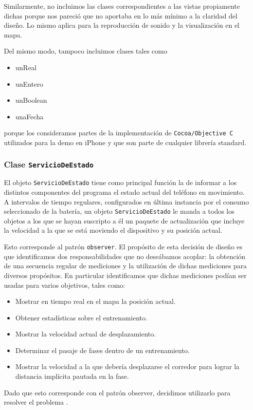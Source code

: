 \documentclass[10pt, a4paper,english,spanish]{article}
\begin{document}
Similarmente, no incluimos las clases correspondientes a las vistas propiamente dichas porque nos pareció que no aportaba en lo más mínimo a la claridad del diseño. Lo mismo aplica para la reproducción de sonido y la visualización en el mapa. 

Del mismo modo, tampoco incluimos clases tales como 
\begin{itemize}
	\item unReal
	\item unEntero
	\item unBoolean
	\item unaFecha
\end{itemize}
porque los consideramos partes de la implementación de \texttt{Cocoa/Objective C} utilizados para la demo en iPhone y que son parte de cualquier librería standard.


\subsubsection{Clase \texttt{ServicioDeEstado}}
El objeto \texttt{ServicioDeEstado} tiene como principal función la de informar a los distintos componentes del programa el estado actual del teléfono en movimiento. A intervalos de tiempo regulares, configurados en última instancia por el consumo seleccionado de la batería, un objeto \texttt{ServicioDeEstado} le manda a todos los objetos a los que se hayan suscripto a él un paquete de actualización que incluye la velocidad a la que se está moviendo el dispositivo y su posición actual.

Esto corresponde al patrón \texttt{observer}. El propósito de esta decisión de diseño es que identificamos dos responsabilidades que no deseábamos acoplar: la obtención de una secuencia regular de mediciones y la utilización de dichas mediciones para diversos propósitos. En particular identificamos que dichas mediciones podían ser usadas para varios objetivos, tales como:
\begin{itemize}
	\item Mostrar en tiempo real en el mapa la posición actual.
	\item Obtener estadísticas sobre el entrenamiento.
	\item Mostrar la velocidad actual de desplazamiento.
	\item Determinar el pasaje de fases dentro de un entrenamiento.
	\item Mostrar la velocidad a la que debería desplazarse el corredor para lograr la distancia implícita pautada en la fase.
\end{itemize}
Dado que esto corresponde con el patrón observer, decidimos utilizarlo para resolver el problema \cite{Gamma}.
\end{document}
